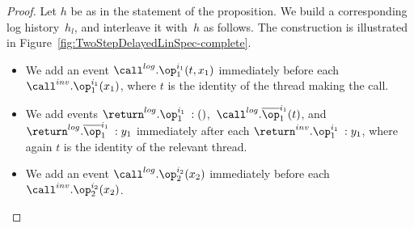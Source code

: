 \begin{proof}
Let $h$ be as in the statement of the proposition.  We build a corresponding
log history~$h_l$, and interleave it with~$h$ as follows.  The construction is
illustrated in Figure~\ref{fig:TwoStepDelayedLinSpec-complete}.
%
\begin{itemize}
\item We add an event $\call^{log}.\op_1^{i_1}(t,x_1)$ immediately before
  each $\call^{inv}.\op_1^{i_1}(x_1)$, where $t$ is the identity of the
  thread making the call.

\item We add events $\return^{log}.\op_1^{i_1} \:: ()$,\,
  $\call^{log}.\overline{\op}_1^{i_1}(t)$, and
  $\return^{log}.\overline{\op}_1^{i_1} \:: y_1$ immediately after each
  $\return^{inv}.\op_1^{i_1} \:: y_1$, where again $t$ is the identity of the
  relevant thread.

\item We add an event $\call^{log}.\op_2^{i_2}(x_2)$ immediately before
  each $\call^{inv}.\op_2^{i_2}(x_2)$.


\end{itemize}
\end{proof}
